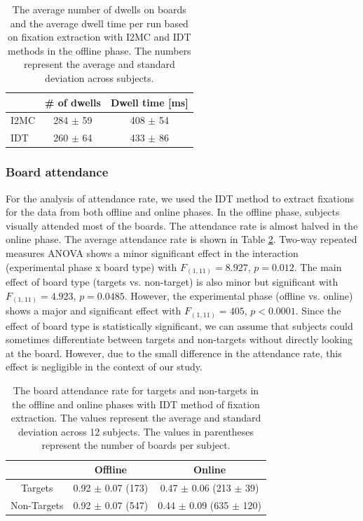 \documentclass[12pt]{iopart}
\begin{document}
\begin{table}
    \centering
    \caption{The average number of dwells on boards and the average 
        dwell time per run
    based on fixation extraction with I2MC and IDT methods in the
    offline phase.
    The numbers represent the average and standard deviation across subjects.
}
    \begin{tabular}{l | c |c}
        \hline 
        & \# of dwells & Dwell time [ms] \\
        \hline 
        I2MC & 284 $\pm$ 59  & 408 $\pm$ 54 \\
        IDT & 260 $\pm$ 64  & 433 $\pm$ 86 \\
        \hline 
    \end{tabular}
    \label{tab:EyeMethods}
\end{table}
\subsubsection*{Board attendance}
For the analysis of attendance rate, we used the IDT method to extract fixations 
for the data from both offline and online phases.
In the offline phase, subjects visually attended most of the boards. The attendance rate is almost halved in the online phase. 
The average attendance rate
is shown in Table \ref{tab:boardAtt}. 
Two-way repeated measures ANOVA shows a minor significant effect 
in the interaction (experimental phase x board type) with $F_{(1,11)} = 8.927$, $p = 0.012$. 
The main effect of board type (targets vs. non-target) is also minor but significant with $F_{(1,11)} = 4.923$, $p =0.0485$. 
However, the experimental phase (offline vs. online)
shows a major and significant effect with $F_{(1,11)} = 405$, $p < 0.0001$.
Since the effect of board type is statistically significant,
we can assume that subjects could sometimes differentiate between targets
and non-targets without directly looking at the board.
However, due to the small difference in the attendance rate,
this effect is negligible in the context of our study.


\begin{table}
    \centering
    \caption{The board attendance rate for targets and non-targets in the offline and online phases with IDT method of fixation
        extraction.
    The values represent the average and standard deviation across 12 subjects.
The values in parentheses represent the number of boards per subject.}
    \begin{tabular}{c | c | c}
        \hline 
        & Offline & Online \\
        \hline 
        Targets & 0.92 $\pm$ 0.07 (173) & 0.47 $\pm$ 0.06 (213 $\pm$ 39)\\
        Non-Targets & 0.92 $\pm$ 0.07 (547) & 0.44 $\pm$ 0.09  (635 $\pm$ 120)\\
        \hline 
    \end{tabular}
    \label{tab:boardAtt}
\end{table}
\end{document}
